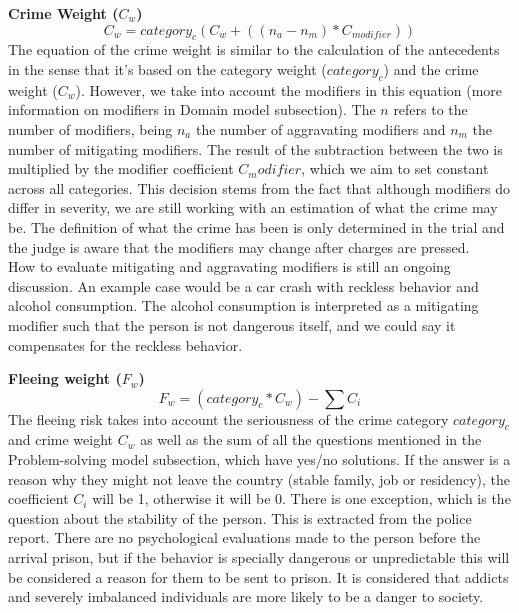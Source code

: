 \documentclass{article}
\begin{document}
\textbf{Crime Weight ($C_w$)}
\begin{equation}
    C_w= category_c (C_w + ((n_a -n_m) *C_{modifier}))
\end{equation}
The equation of the crime weight is similar to the calculation of the antecedents in the sense that it's based on the category weight ($category_c$) and the crime weight ($C_w$). However, we take into account the modifiers in this equation (more information on modifiers in Domain model subsection). The $n$ refers to the number of modifiers, being $n_a$ the number of aggravating modifiers and $n_m$ the number of mitigating modifiers. The result of the subtraction between the two is multiplied by the modifier coefficient $C_modifier$, which we aim to set constant across all categories.
This decision stems from the fact that although modifiers do differ in severity, we are still working with an estimation of what the crime may be. The definition of what the crime has been is only determined in the trial and the judge is aware that the modifiers may change after charges are pressed. \\
How to evaluate mitigating and aggravating modifiers is still an ongoing discussion. An example case would be a car crash with reckless behavior and alcohol consumption. The alcohol consumption is interpreted as a mitigating modifier such that the person is not dangerous itself, and we could say it compensates for the reckless behavior. 

\textbf{Fleeing weight ($F_w$)}
\begin{equation}
    F_w= (category_c*C_w) - \sum C_i
\end{equation}
The fleeing risk takes into account the seriousness of the crime category $category_c$ and crime weight $C_w$ as well as the sum of all the questions mentioned in the Problem-solving model subsection, which have yes/no solutions. If the answer is a reason why they might not leave the country (stable family, job or residency), the coefficient $C_i$ will be 1, otherwise it will be 0. There is one exception, which is the question about the stability of the person. This is extracted from the police report. There are no psychological evaluations made to the person before the arrival prison, but if the behavior is specially dangerous or unpredictable this will be considered a reason for them to be sent to prison. It is considered that addicts and severely imbalanced individuals are more likely to be a danger to society.
\end{document}
